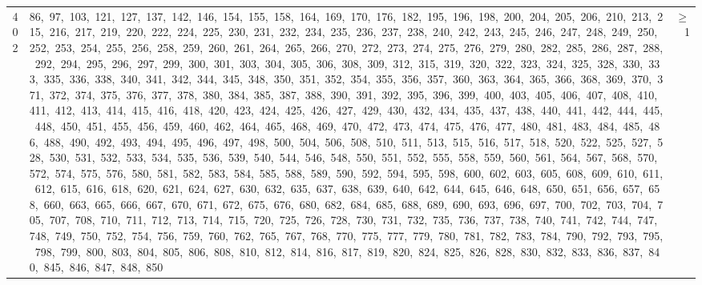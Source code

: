 \begin{longtable}{c|p{}|r}
402 & 86,\ 97,\ 103,\ 121,\ 127,\ 137,\ 142,\ 146,\ 154,\ 155,\ 158,\ 164,\ 169,\ 170,\ 176,\ 182,\ 195,\ 196,\ 198,\ 200,\ 204,\ 205,\ 206,\ 210,\ 213,\ 215,\ 216,\ 217,\ 219,\ 220,\ 222,\ 224,\ 225,\ 230,\ 231,\ 232,\ 234,\ 235,\ 236,\ 237,\ 238,\ 240,\ 242,\ 243,\ 245,\ 246,\ 247,\ 248,\ 249,\ 250,\ 252,\ 253,\ 254,\ 255,\ 256,\ 258,\ 259,\ 260,\ 261,\ 264,\ 265,\ 266,\ 270,\ 272,\ 273,\ 274,\ 275,\ 276,\ 279,\ 280,\ 282,\ 285,\ 286,\ 287,\ 288,\ 292,\ 294,\ 295,\ 296,\ 297,\ 299,\ 300,\ 301,\ 303,\ 304,\ 305,\ 306,\ 308,\ 309,\ 312,\ 315,\ 319,\ 320,\ 322,\ 323,\ 324,\ 325,\ 328,\ 330,\ 333,\ 335,\ 336,\ 338,\ 340,\ 341,\ 342,\ 344,\ 345,\ 348,\ 350,\ 351,\ 352,\ 354,\ 355,\ 356,\ 357,\ 360,\ 363,\ 364,\ 365,\ 366,\ 368,\ 369,\ 370,\ 371,\ 372,\ 374,\ 375,\ 376,\ 377,\ 378,\ 380,\ 384,\ 385,\ 387,\ 388,\ 390,\ 391,\ 392,\ 395,\ 396,\ 399,\ 400,\ 403,\ 405,\ 406,\ 407,\ 408,\ 410,\ 411,\ 412,\ 413,\ 414,\ 415,\ 416,\ 418,\ 420,\ 423,\ 424,\ 425,\ 426,\ 427,\ 429,\ 430,\ 432,\ 434,\ 435,\ 437,\ 438,\ 440,\ 441,\ 442,\ 444,\ 445,\ 448,\ 450,\ 451,\ 455,\ 456,\ 459,\ 460,\ 462,\ 464,\ 465,\ 468,\ 469,\ 470,\ 472,\ 473,\ 474,\ 475,\ 476,\ 477,\ 480,\ 481,\ 483,\ 484,\ 485,\ 486,\ 488,\ 490,\ 492,\ 493,\ 494,\ 495,\ 496,\ 497,\ 498,\ 500,\ 504,\ 506,\ 508,\ 510,\ 511,\ 513,\ 515,\ 516,\ 517,\ 518,\ 520,\ 522,\ 525,\ 527,\ 528,\ 530,\ 531,\ 532,\ 533,\ 534,\ 535,\ 536,\ 539,\ 540,\ 544,\ 546,\ 548,\ 550,\ 551,\ 552,\ 555,\ 558,\ 559,\ 560,\ 561,\ 564,\ 567,\ 568,\ 570,\ 572,\ 574,\ 575,\ 576,\ 580,\ 581,\ 582,\ 583,\ 584,\ 585,\ 588,\ 589,\ 590,\ 592,\ 594,\ 595,\ 598,\ 600,\ 602,\ 603,\ 605,\ 608,\ 609,\ 610,\ 611,\ 612,\ 615,\ 616,\ 618,\ 620,\ 621,\ 624,\ 627,\ 630,\ 632,\ 635,\ 637,\ 638,\ 639,\ 640,\ 642,\ 644,\ 645,\ 646,\ 648,\ 650,\ 651,\ 656,\ 657,\ 658,\ 660,\ 663,\ 665,\ 666,\ 667,\ 670,\ 671,\ 672,\ 675,\ 676,\ 680,\ 682,\ 684,\ 685,\ 688,\ 689,\ 690,\ 693,\ 696,\ 697,\ 700,\ 702,\ 703,\ 704,\ 705,\ 707,\ 708,\ 710,\ 711,\ 712,\ 713,\ 714,\ 715,\ 720,\ 725,\ 726,\ 728,\ 730,\ 731,\ 732,\ 735,\ 736,\ 737,\ 738,\ 740,\ 741,\ 742,\ 744,\ 747,\ 748,\ 749,\ 750,\ 752,\ 754,\ 756,\ 759,\ 760,\ 762,\ 765,\ 767,\ 768,\ 770,\ 775,\ 777,\ 779,\ 780,\ 781,\ 782,\ 783,\ 784,\ 790,\ 792,\ 793,\ 795,\ 798,\ 799,\ 800,\ 803,\ 804,\ 805,\ 806,\ 808,\ 810,\ 812,\ 814,\ 816,\ 817,\ 819,\ 820,\ 824,\ 825,\ 826,\ 828,\ 830,\ 832,\ 833,\ 836,\ 837,\ 840,\ 845,\ 846,\ 847,\ 848,\ 850 & $\ge$ 1 \\

\end{longtable}
